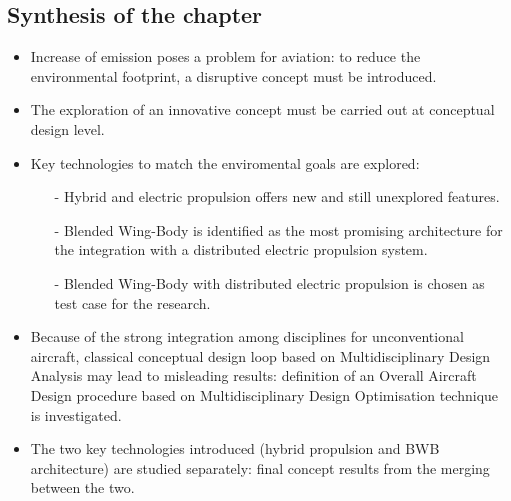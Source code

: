 \clearpage

\begin{mdframed}[hidealllines=true,backgroundcolor=blue!20]
	\section*{Synthesis of the chapter}
	
	\begin{itemize}
		\item Increase of emission poses a problem for aviation: to reduce the environmental footprint, a disruptive concept must be introduced. 
		
		\item The exploration of an innovative concept must be carried out at conceptual design level. 
		
		\item Key technologies to match the enviromental goals are explored:
			\begin{itemize}
				
				\item[-] Hybrid and electric propulsion offers new and still unexplored features. 
				
				\item[-] Blended Wing-Body is identified as the most promising architecture for the integration with a distributed electric propulsion system.
				
				\item[-] Blended Wing-Body with distributed electric propulsion is chosen as test case for the research.
				
			\end{itemize}
		
		\item Because of the strong integration among disciplines for unconventional aircraft, classical conceptual design loop based on Multidisciplinary Design Analysis may lead to misleading results: definition of an Overall Aircraft Design procedure based on Multidisciplinary Design Optimisation technique is investigated. 
		
		\item The two key technologies introduced (hybrid propulsion and BWB architecture) are studied separately: final concept results from the merging between the two. 
	\end{itemize}
\end{mdframed}
